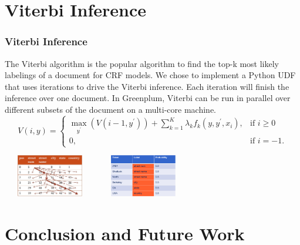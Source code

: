 \documentclass{beamer}
\begin{document}
\section{Viterbi Inference}
\begin{frame}
  \frametitle{Viterbi Inference}
  The Viterbi algorithm is the popular algorithm to find the top-k most likely labelings of a document 
for CRF models. 
We chose to implement a Python UDF that uses iterations to drive the Viterbi inference. Each iteration will 
finish the inference over one document.
In Greenplum, Viterbi can be run in parallel over different subsets 
of the document on a multi-core machine.
\[
V(i,y) =
\begin{cases}
 \max_{y^\prime}(V(i-1,y^\prime)) + \textstyle \sum_{k=1}^K \lambda_kf_k(y,y^\prime,x_i), & \text{if } i\ge0 \\
 0, & \text{if } i=-1.
\end{cases}
\]
\begin{center}		             
      \includegraphics[height=5em,width=11em]{viterbip.jpg}
      \includegraphics[height=5em,width=11em]{result.png}\\
\end{center}
\end{frame}

\section{Conclusion and Future Work}
\end{document}
